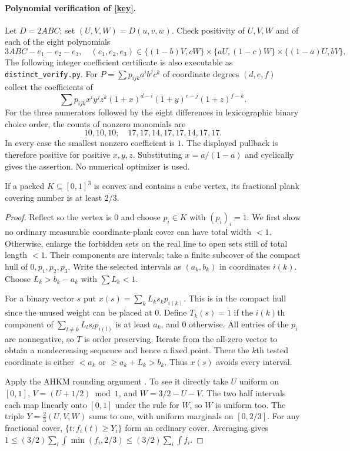 \documentclass[11pt]{article}
\begin{document}
\paragraph{Polynomial verification of \eqref{key}.} Let $D=2ABC$; set $(U,V,W)=D(u,v,w)$. Check positivity of $U,V,W$ and of each of the eight polynomials
\[
 3ABC-e_1-e_2-e_3,\quad
 (e_1,e_2,e_3)\in\{(1-b)V,cW\}\times\{aU,(1-c)W\}\times\{(1-a)U,bV\}.
\]
The following integer coefficient certificate is also executable as \texttt{distinct\_verify.py}. For $P=\sum p_{ijk}a^ib^jc^k$ of coordinate degrees $(d,e,f)$ collect the coefficients of
\[
 \sum p_{ijk}x^iy^jz^k(1+x)^{d-i}(1+y)^{e-j}(1+z)^{f-k}.
\]
For the three numerators followed by the eight differences in lexicographic binary choice order, the counts of nonzero monomials are
\[
10,10,10;\quad 17,17,14,17,17,14,17,17.
\]
In every case the smallest nonzero coefficient is $1$. The displayed pullback is therefore positive for positive $x,y,z$. Substituting $x=a/(1-a)$ and cyclically gives the assertion. No numerical optimizer is used.
\begin{lemma}\label{corner} If a packed $K\subseteq[0,1]^3$ is convex and contains a cube vertex, its fractional plank covering number is at least $2/3$.\end{lemma}
\begin{proof} Reflect so the vertex is $0$ and choose $p_i\in K$ with $(p_i)_i=1$. We first show no ordinary measurable coordinate-plank cover can have total width $<1$. Otherwise, enlarge the forbidden sets on the real line to open sets still of total length $<1$. Their components are intervals; take a finite subcover of the compact hull of $0,p_1,p_2,p_3$. Write the selected intervals as $(a_k,b_k)$ in coordinates $i(k)$. Choose $L_k>b_k-a_k$ with $\sum L_k<1$.

For a binary vector $s$ put $x(s)=\sum_k L_k s_k p_{i(k)}$. This is in the compact hull since the unused weight can be placed at 0. Define $T_k(s)=1$ if the $i(k)$th component of $\sum_{l\ne k} L_l s_l p_{i(l)}$ is at least $a_k$, and $0$ otherwise. All entries of the $p_i$ are nonnegative, so $T$ is order preserving. Iterate from the all-zero vector to obtain a nondecreasing sequence and hence a fixed point. There the $k$th tested coordinate is either $<a_k$ or $\ge a_k+L_k>b_k$. Thus $x(s)$ avoids every interval.

Apply the AHKM rounding argument \cite[Thm.~3.1]{AHKM}. To see it directly take $U$ uniform on $[0,1]$, $V=(U+1/2)\bmod 1$, and $W=3/2-U-V$. The two half intervals each map linearly onto $[0,1]$ under the rule for $W$, so $W$ is uniform too. The triple $Y=\tfrac23(U,V,W)$ sums to one, with uniform marginals on $[0,2/3]$. For any fractional cover, $\{t:f_i(t)\ge Y_i\}$ form an ordinary cover. Averaging gives $1\le(3/2)\sum_i\int\min(f_i,2/3)\le(3/2)\sum_i\int f_i$.
\end{proof}
\end{document}
